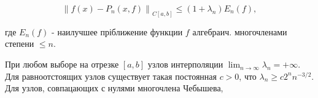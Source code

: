 \documentclass[10pt]{article}
\begin{document}
\[

\left\|f(x)-P_{n}(x, f)\right\|_{C[a, b]} \leqslant\left(1+\lambda_{n}\right) E_{n}(f),

\]



где $E_{n}(f)$ - наилучшее пріближение функции $f$ алгебраич. многочленами степени $\leqslant n$.



При любом выборе на отрезке $[a, b]$ узлов интерполяции $\lim _{n \rightarrow \infty} \lambda_{n}=+\infty$. Для равноотстоящих узлов существует такая постоянная $c>0$, что $\lambda_{n} \geqslant c 2^{n} n^{-3 / 2}$. Для узлов, совпацающих с нулями многочлена Чебышева,
\end{document}
